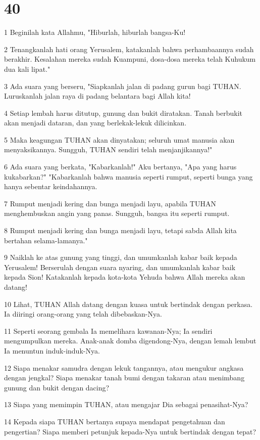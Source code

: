 \chapter{40}

\par 1 Beginilah kata Allahmu, "Hiburlah, hiburlah bangsa-Ku!
\par 2 Tenangkanlah hati orang Yerusalem, katakanlah bahwa perhambaannya sudah berakhir. Kesalahan mereka sudah Kuampuni, dosa-dosa mereka telah Kuhukum dua kali lipat."
\par 3 Ada suara yang berseru, "Siapkanlah jalan di padang gurun bagi TUHAN. Luruskanlah jalan raya di padang belantara bagi Allah kita!
\par 4 Setiap lembah harus ditutup, gunung dan bukit diratakan. Tanah berbukit akan menjadi dataran, dan yang berlekak-lekuk dilicinkan.
\par 5 Maka keagungan TUHAN akan dinyatakan; seluruh umat manusia akan menyaksikannya. Sungguh, TUHAN sendiri telah menjanjikannya!"
\par 6 Ada suara yang berkata, "Kabarkanlah!" Aku bertanya, "Apa yang harus kukabarkan?" "Kabarkanlah bahwa manusia seperti rumput, seperti bunga yang hanya sebentar keindahannya.
\par 7 Rumput menjadi kering dan bunga menjadi layu, apabila TUHAN menghembuskan angin yang panas. Sungguh, bangsa itu seperti rumput.
\par 8 Rumput menjadi kering dan bunga menjadi layu, tetapi sabda Allah kita bertahan selama-lamanya."
\par 9 Naiklah ke atas gunung yang tinggi, dan umumkanlah kabar baik kepada Yerusalem! Berserulah dengan suara nyaring, dan umumkanlah kabar baik kepada Sion! Katakanlah kepada kota-kota Yehuda bahwa Allah mereka akan datang!
\par 10 Lihat, TUHAN Allah datang dengan kuasa untuk bertindak dengan perkasa. Ia diiringi orang-orang yang telah dibebaskan-Nya.
\par 11 Seperti seorang gembala Ia memelihara kawanan-Nya; Ia sendiri mengumpulkan mereka. Anak-anak domba digendong-Nya, dengan lemah lembut Ia menuntun induk-induk-Nya.
\par 12 Siapa menakar samudra dengan lekuk tangannya, atau mengukur angkasa dengan jengkal? Siapa menakar tanah bumi dengan takaran atau menimbang gunung dan bukit dengan dacing?
\par 13 Siapa yang memimpin TUHAN, atau mengajar Dia sebagai penasihat-Nya?
\par 14 Kepada siapa TUHAN bertanya supaya mendapat pengetahuan dan pengertian? Siapa memberi petunjuk kepada-Nya untuk bertindak dengan tepat?

